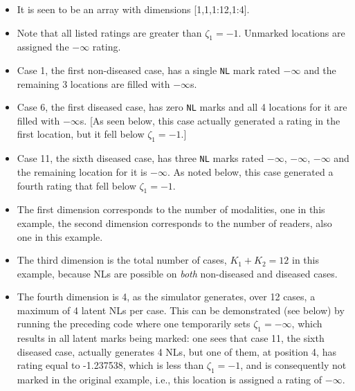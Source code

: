 \documentclass[
]{book}
\begin{document}
\begin{itemize}
\item
  It is seen to be an array with dimensions {[}1,1,1:12,1:4{]}.
\item
  Note that all listed ratings are greater than \(\zeta_1 = -1\). Unmarked locations are assigned the \(-\infty\) rating.
\item
  Case 1, the first non-diseased case, has a single \texttt{NL} mark rated \ensuremath{-\infty{}} and the remaining 3 locations are filled with \(-\infty\)s.
\item
  Case 6, the first diseased case, has zero \texttt{NL} marks and all 4 locations for it are filled with \(-\infty\)s. {[}As seen below, this case actually generated a rating in the first location, but it fell below \(\zeta_1 = -1\).{]}
\item
  Case 11, the sixth diseased case, has three \texttt{NL} marks rated \ensuremath{-\infty{}}, \ensuremath{-\infty{}}, \ensuremath{-\infty{}} and the remaining location for it is \(-\infty\). As noted below, this case generated a fourth rating that fell below \(\zeta_1 = -1\).
\item
  The first dimension corresponds to the number of modalities, one in this example, the second dimension corresponds to the number of readers, also one in this example.
\item
  The third dimension is the total number of cases, \(K_1+K_2 = 12\) in this example, because NLs are possible on \emph{both} non-diseased and diseased cases.
\item
  The fourth dimension is 4, as the simulator generates, over 12 cases, a maximum of 4 latent NLs per case. This can be demonstrated (see below) by running the preceding code where one temporarily sets \(\zeta_1 = -\infty\), which results in all latent marks being marked: one sees that case 11, the sixth diseased case, actually generates 4 NLs, but one of them, at position 4, has rating equal to -1.237538, which is less than \(\zeta_1 = -1\), and is consequently not marked in the original example, i.e., this location is assigned a rating of \(-\infty\).
\end{itemize}
\end{document}
